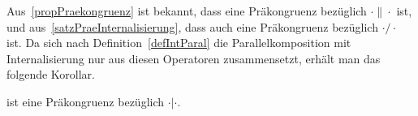 Aus~\ref{propPraekongruenz} ist bekannt, dass \ERel{} eine Präkongruenz
bezüglich $\cdot\|\cdot$ ist, und aus~\ref{satzPraeInternalisierung}, dass
\ERel{} auch eine Präkongruenz bezüglich $\cdot/\cdot$ ist. Da sich nach
Definition~\ref{defIntParal} die Parallelkomposition mit Internalisierung nur
aus diesen Operatoren zusammensetzt, erhält man das folgende Korollar.

\begin{kor}
  \ERel{} ist eine Präkongruenz bezüglich $\cdot|\cdot$.
\end{kor}
